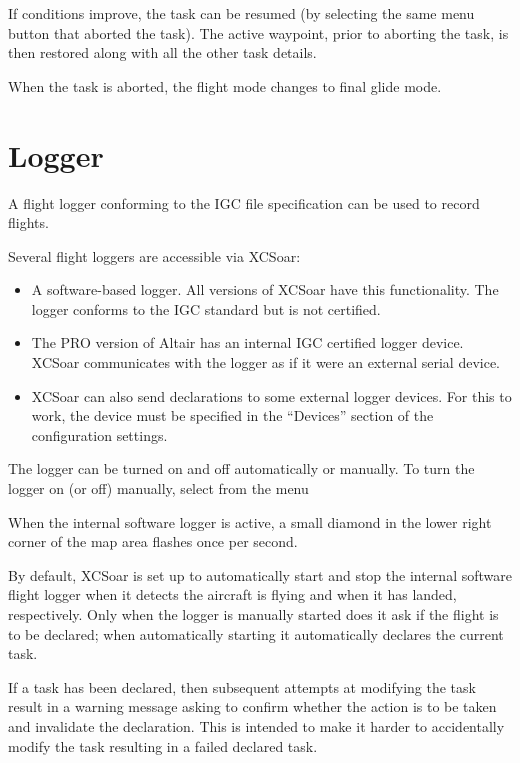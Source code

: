 \documentclass[a4paper,12pt]{refrep}
\begin{document}
If conditions improve, the task can be resumed (by selecting the same
menu button that aborted the task).  The active waypoint, prior to
aborting the task, is then restored along with all the other task
details.

When the task is aborted, the flight mode changes to final glide mode.

\section{Logger}

A flight logger conforming to the IGC file specification can be used
to record flights.  

Several flight loggers are accessible via XCSoar:
\begin{itemize}
\item A software-based logger.  All versions of XCSoar have this
  functionality.  The logger conforms to the IGC standard but is not
  certified.
\item The PRO version of Altair has an internal IGC certified logger device.
  XCSoar communicates with the logger as if it were an external serial device.

\item XCSoar can also send declarations to some external logger devices. 
For this to work, the device must be specified in the ``Devices'' 
section of the configuration  settings.
\end{itemize}

The logger can be turned on and off automatically or manually.  
To turn the logger on (or off) manually, select from the menu
\begin{quote}
\blink{}\blink{}
\end{quote}

When the internal software logger is active, a small diamond in the
lower right corner of the map area flashes once per second.

By default, XCSoar is set up to automatically start and stop the
internal software flight logger when it detects the aircraft is flying
and when it has landed, respectively.  Only when the logger is
manually started does it ask if the flight is to be declared; when
automatically starting it automatically declares the current task.

If a task has been declared, then subsequent attempts at modifying the
task result in a warning message asking to confirm whether the action
is to be taken and invalidate the declaration.  This is intended to
make it harder to accidentally modify the task resulting in a failed
declared task.
\end{document}
